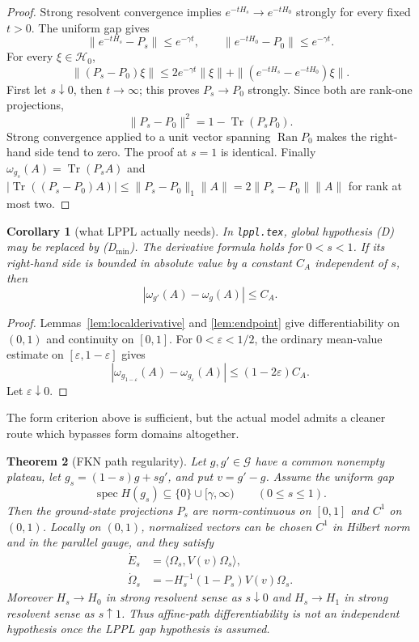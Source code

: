 \documentclass[11pt,a4paper]{article}
\newtheorem{theorem}{Theorem}[section]
\newtheorem{corollary}[theorem]{Corollary}
\theoremstyle{remark}
\newcommand{\Hh}{\mathcal H_0}
\newcommand{\Om}{\Omega}
\newcommand{\G}{\mathcal G}
\DeclareMathOperator{\spec}{spec}
\DeclareMathOperator{\Tr}{Tr}
\begin{document}
\begin{proof}
Strong resolvent convergence implies
$e^{-tH_s}\to e^{-tH_0}$ strongly for every fixed $t>0$.  The uniform gap gives
\[
 \|e^{-tH_s}-P_s\|\le e^{-\gamma t},
 \qquad \|e^{-tH_0}-P_0\|\le e^{-\gamma t}.
\]
For every $\xi\in\Hh$,
\[
 \|(P_s-P_0)\xi\|
 \le2e^{-\gamma t}\|\xi\|
   +\|(e^{-tH_s}-e^{-tH_0})\xi\|.
\]
First let $s\downarrow0$, then $t\to\infty$; this proves $P_s\to P_0$ strongly.  Since both are
rank-one projections,
\[
 \|P_s-P_0\|^2=1-\Tr(P_sP_0).
\]
Strong convergence applied to a unit vector spanning $\operatorname{Ran}P_0$ makes the right-hand
side tend to zero.  The proof at $s=1$ is identical.  Finally
$\omega_{g_s}(A)=\Tr(P_sA)$ and
$|\Tr((P_s-P_0)A)|\le\|P_s-P_0\|_1\|A\|=2\|P_s-P_0\|\|A\|$ for rank at most two.
\end{proof}

\begin{corollary}[what LPPL actually needs]\label{cor:Dmin}
In \texttt{lppl.tex}, global hypothesis (D) may be replaced by
(D$_\mathrm{min}$).  The derivative formula holds for $0<s<1$.  If its right-hand side is bounded
in absolute value by a constant $C_A$ independent of $s$, then
\[
 |\omega_{g'}(A)-\omega_g(A)|\le C_A.
\]
\end{corollary}

\begin{proof}
Lemmas~\ref{lem:localderivative} and \ref{lem:endpoint} give differentiability on $(0,1)$ and
continuity on $[0,1]$.  For $0<\varepsilon<1/2$, the ordinary mean-value estimate on
$[\varepsilon,1-\varepsilon]$ gives
\[
 |\omega_{g_{1-\varepsilon}}(A)-\omega_{g_\varepsilon}(A)|
 \le (1-2\varepsilon)C_A.
\]
Let $\varepsilon\downarrow0$.
\end{proof}

The form criterion above is sufficient, but the actual model admits a cleaner route which bypasses
form domains altogether.

\begin{theorem}[FKN path regularity]\label{thm:FKNpath}
Let $g,g'\in\G$ have a common nonempty plateau, let $g_s=(1-s)g+sg'$, and put
$v=g'-g$.  Assume the uniform gap
\[
 \spec H(g_s)\subseteq\{0\}\cup[\gamma,\infty)
 \qquad(0\le s\le1).
\]
Then the ground-state projections $P_s$ are norm-continuous on $[0,1]$ and $C^1$ on $(0,1)$.
Locally on $(0,1)$, normalized vectors can be chosen $C^1$ in Hilbert norm and in the parallel
gauge, and they satisfy
\begin{align*}
 \dot E_s&=\langle\Om_s,V(v)\Om_s\rangle,\\
 \dot\Om_s&=-H_s^{-1}(1-P_s)V(v)\Om_s.
\end{align*}
Moreover $H_s\to H_0$ in strong resolvent sense as $s\downarrow0$ and
$H_s\to H_1$ in strong resolvent sense as $s\uparrow1$.  Thus affine-path differentiability is
not an independent hypothesis once the LPPL gap hypothesis is assumed.
\end{theorem}
\end{document}
